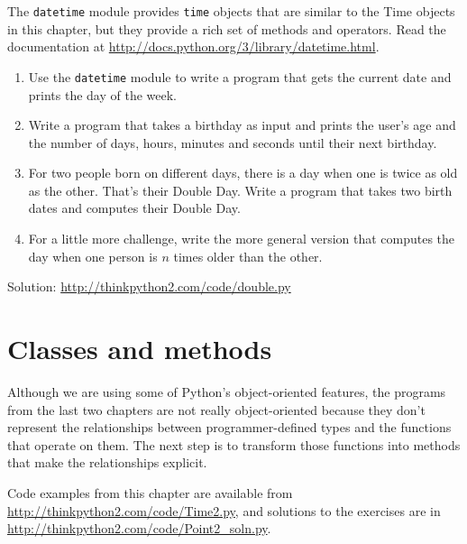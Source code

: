 \documentclass[10pt]{book}
\begin{document}
\begin{exercise}

The {\tt datetime} module provides {\tt time} objects
that are similar to the Time objects in this chapter, but
they provide a rich set of methods and operators.  Read the
documentation at \url{http://docs.python.org/3/library/datetime.html}.

\begin{enumerate}

\item Use the {\tt datetime} module to write a program that gets the
  current date and prints the day of the week.

\item Write a program that takes a birthday as input and prints the
  user's age and the number of days, hours, minutes and seconds until
  their next birthday.

\item For two people born on different days, there is a day when one
  is twice as old as the other.  That's their Double Day.  Write a
  program that takes two birth dates and computes their Double Day.

\item For a little more challenge, write the more general version that
  computes the day when one person is $n$ times older than the other.

\end{enumerate}

Solution: \url{http://thinkpython2.com/code/double.py}

\end{exercise}


\chapter{Classes and methods}

Although we are using some of Python's object-oriented features,
the programs from the last two chapters are not really
object-oriented because they don't represent the relationships
between programmer-defined types and the functions that operate
on them.  The next step is to transform those functions into
methods that make the relationships explicit.

Code examples from this chapter are available from
\url{http://thinkpython2.com/code/Time2.py}, and solutions
to the exercises are in \url{http://thinkpython2.com/code/Point2_soln.py}.
\end{document}
